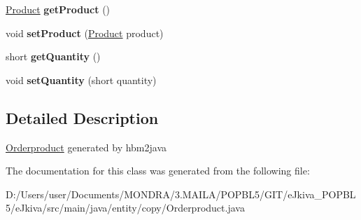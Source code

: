 \begin{DoxyCompactItemize}
\mbox{\hyperlink{classentity_1_1copy_1_1_product}{Product}} {\bfseries get\+Product} ()
\item 
\mbox{\label{classentity_1_1copy_1_1_orderproduct_a919266deed77c0f42824ea923da340af}} 
void {\bfseries set\+Product} (\mbox{\hyperlink{classentity_1_1copy_1_1_product}{Product}} product)
\item 
\mbox{\label{classentity_1_1copy_1_1_orderproduct_a50c5839107b066502b566dd6a56ebd74}} 
short {\bfseries get\+Quantity} ()
\item 
\mbox{\label{classentity_1_1copy_1_1_orderproduct_af6b91f509a7bf6c54055d4a56d4723e3}} 
void {\bfseries set\+Quantity} (short quantity)
\end{DoxyCompactItemize}


\subsection{Detailed Description}
\mbox{\hyperlink{classentity_1_1copy_1_1_orderproduct}{Orderproduct}} generated by hbm2java 

The documentation for this class was generated from the following file\+:\begin{DoxyCompactItemize}
\item 
D\+:/\+Users/user/\+Documents/\+M\+O\+N\+D\+R\+A/3.\+M\+A\+I\+L\+A/\+P\+O\+P\+B\+L5/\+G\+I\+T/e\+Jkiva\+\_\+\+P\+O\+P\+B\+L5/e\+Jkiva/src/main/java/entity/copy/Orderproduct.\+java\end{DoxyCompactItemize}
